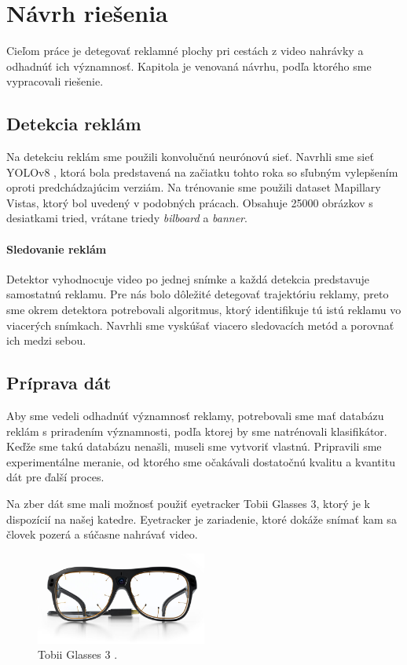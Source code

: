 \chapter{Návrh riešenia}\label{chap:proposal}

Cieľom práce je detegovať reklamné plochy pri cestách z video nahrávky a odhadnúť ich významnosť. Kapitola je venovaná návrhu, podľa ktorého sme vypracovali riešenie.  

\section{Detekcia reklám}

Na detekciu reklám sme použili konvolučnú neurónovú sieť. Navrhli sme sieť YOLOv8 \cite{yolov8}, ktorá bola predstavená na začiatku tohto roka so sľubným vylepšením oproti predchádzajúcim verziám. Na trénovanie sme použili dataset Mapillary Vistas, ktorý bol uvedený v podobných prácach. Obsahuje 25000 obrázkov s desiatkami tried, vrátane triedy \textit{bilboard} a \textit{banner}.


\subsubsection{Sledovanie reklám}

Detektor vyhodnocuje video po jednej snímke a každá detekcia predstavuje samostatnú reklamu. Pre nás bolo dôležité detegovať trajektóriu reklamy, preto sme okrem detektora potrebovali algoritmus, ktorý identifikuje tú istú reklamu vo viacerých snímkach. Navrhli sme vyskúšať viacero sledovacích metód a porovnať ich medzi sebou.

\section{Príprava dát}

Aby sme vedeli odhadnúť významnosť reklamy, potrebovali sme mať databázu reklám s priradením významnosti, podľa ktorej by sme natrénovali klasifikátor. Keďže sme takú databázu nenašli, museli sme vytvoriť vlastnú. Pripravili sme experimentálne meranie, od ktorého sme očakávali dostatočnú kvalitu a kvantitu dát pre ďalší proces.

Na zber dát sme mali možnosť použiť eyetracker Tobii Glasses 3, ktorý je k dispozícií na našej katedre. Eyetracker je zariadenie, ktoré dokáže snímať kam sa človek pozerá a súčasne nahrávať video.

\begin{figure}[ht]
    \centering
    \includegraphics[width=0.5\textwidth]{images/03/glasses.jpg}
    \caption{Tobii Glasses 3 \cite{tobii}.}
    \label{img:tobii}
\end{figure}

